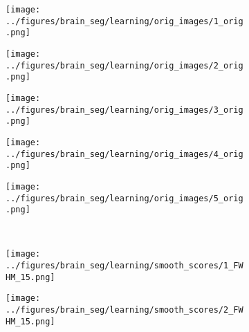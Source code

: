 \begin{figure}[h!] %
	\centering
	\begin{subfigure}[b]{0.03\textwidth} %
		\centering
	\end{subfigure}
	\hspace{0.1cm}
	\begin{subfigure}{0.16\textwidth}
		\centering
		\texttt{[image: ../figures/brain\_seg/learning/orig\_images/1\_orig.png]}
		\label{fig:1}
	\end{subfigure}
	\begin{subfigure}{0.16\textwidth}
		\centering
		\texttt{[image: ../figures/brain\_seg/learning/orig\_images/2\_orig.png]}
		\label{fig:2}
	\end{subfigure}
	\begin{subfigure}{0.16\textwidth}
		\centering
		\texttt{[image: ../figures/brain\_seg/learning/orig\_images/3\_orig.png]}
		\label{fig:3}
	\end{subfigure}
	\begin{subfigure}{0.16\textwidth}
		\centering
		\texttt{[image: ../figures/brain\_seg/learning/orig\_images/4\_orig.png]}
		\label{fig:4}
	\end{subfigure}
	\begin{subfigure}{0.16\textwidth}
		\centering
		\texttt{[image: ../figures/brain\_seg/learning/orig\_images/5\_orig.png]}
		\label{fig:5}
	\end{subfigure}
	\\
	\vspace{-0.35cm}
		\begin{subfigure}[b]{0.03\textwidth} %
		\centering
	\end{subfigure}
	\hspace{0.1cm}
	\begin{subfigure}{0.16\textwidth}
		\centering
		\texttt{[image: ../figures/brain\_seg/learning/smooth\_scores/1\_FWHM\_15.png]}
		\label{fig:6}
	\end{subfigure}
	\begin{subfigure}{0.16\textwidth}
		\centering
		\texttt{[image: ../figures/brain\_seg/learning/smooth\_scores/2\_FWHM\_15.png]}

\end{subfigure}
\end{figure}
